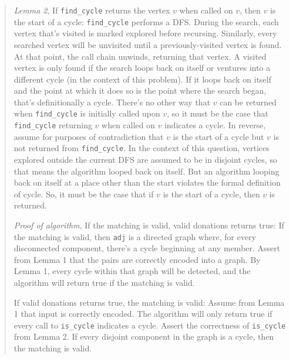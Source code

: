 \documentclass[11pt]{article}
\begin{document}
\begin{enumerate}
\begin{enumerate}
\begin{quote}
  \medskip 
  \textit{Lemma 2}, If \texttt{find\_cycle} returns the vertex $v$ when called on $v$, then $v$ is the start of a cycle: \texttt{find\_cycle} performs a DFS.  During the search, each vertex that's visited is marked explored before recursing. Similarly, every searched vertex will be unvisited until a previously-visited vertex is found. At that point, the call chain unwinds, returning that vertex. A visited vertex is only found if the search loops back on itself or ventures into a different cycle (in the context of this problem). If it loops back on itself and the point at which it does so is the point where the search began, that's definitionally a cycle. There's no other way that $v$ can be returned when \texttt{find\_cycle} is initially called upon $v$, so it must be the case that \texttt{find\_cycle} returning $v$ when called on $v$ indicates a cycle. In reverse, assume for purposes of contradiction that $v$ is the start of a cycle but $v$ is not returned from \texttt{find\_cycle}. In the context of this question, vertices explored outside the current DFS are assumed to be in disjoint cycles, so that means the algorithm looped back on itself. But an algorithm looping back on itself at a place other than the start violates the formal definition of cycle. So, it must be the case that if $v$ is the start of a cycle, then $v$ is returned. 

  \medskip
  \textit{Proof of algorithm}, If the matching is valid, valid donations returns true: If the matching is valid, then \texttt{adj} is a directed graph where, for every disconnected component, there's a cycle  beginning at any member. Assert from Lemma 1 that the pairs are correctly encoded into a graph. By Lemma 1, every cycle within that graph will be detected, and the algorithm will return true if the matching is valid.

  \medskip
  If valid donations returns true, the matching is valid: Assume from Lemma 1 that input is correctly encoded. The algorithm will only return true if every call to \texttt{is\_cycle} indicates a cycle. Assert the correctness of \texttt{is\_cycle} from Lemma 2. If every disjoint component in the graph is a cycle, then the matching is valid.
        

\end{quote}
\end{enumerate}
\end{enumerate}
\end{document}
